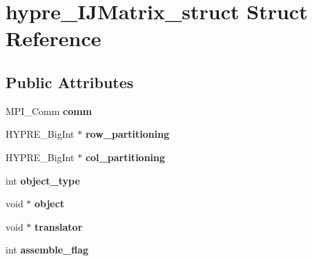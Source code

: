 \hypertarget{structhypre__IJMatrix__struct}{}\section{hypre\+\_\+\+I\+J\+Matrix\+\_\+struct Struct Reference}
\label{structhypre__IJMatrix__struct}
\subsection*{Public Attributes}
\begin{DoxyCompactItemize}
\item 
\hypertarget{structhypre__IJMatrix__struct_a3b601f0a48e45378e55adfeb9f1426a4}{}M\+P\+I\+\_\+\+Comm {\bfseries comm}\label{structhypre__IJMatrix__struct_a3b601f0a48e45378e55adfeb9f1426a4}

\item 
\hypertarget{structhypre__IJMatrix__struct_a6c513346de350200aebee241e008dcf2}{}H\+Y\+P\+R\+E\+\_\+\+Big\+Int $\ast$ {\bfseries row\+\_\+partitioning}\label{structhypre__IJMatrix__struct_a6c513346de350200aebee241e008dcf2}

\item 
\hypertarget{structhypre__IJMatrix__struct_a33258dcfa5e28414c1922db3c23a6e9c}{}H\+Y\+P\+R\+E\+\_\+\+Big\+Int $\ast$ {\bfseries col\+\_\+partitioning}\label{structhypre__IJMatrix__struct_a33258dcfa5e28414c1922db3c23a6e9c}

\item 
\hypertarget{structhypre__IJMatrix__struct_af48d8f6e4bed879bbe261edd72a8d1ea}{}int {\bfseries object\+\_\+type}\label{structhypre__IJMatrix__struct_af48d8f6e4bed879bbe261edd72a8d1ea}

\item 
\hypertarget{structhypre__IJMatrix__struct_aa7b871a27203b738d68840cbc4a0e4ef}{}void $\ast$ {\bfseries object}\label{structhypre__IJMatrix__struct_aa7b871a27203b738d68840cbc4a0e4ef}

\item 
\hypertarget{structhypre__IJMatrix__struct_a22d4449ba22d93c593fddc0eb2e2a8e8}{}void $\ast$ {\bfseries translator}\label{structhypre__IJMatrix__struct_a22d4449ba22d93c593fddc0eb2e2a8e8}

\item 
\hypertarget{structhypre__IJMatrix__struct_a00663cf892a5c2abc5c2c9dd2273cc36}{}int {\bfseries assemble\+\_\+flag}\label{structhypre__IJMatrix__struct_a00663cf892a5c2abc5c2c9dd2273cc36}


\end{DoxyCompactItemize}

